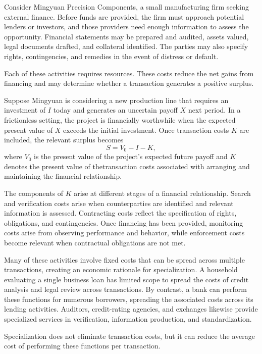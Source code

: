 Consider Mingyuan Precision Components, a small manufacturing firm seeking external finance. Before funds are provided, the firm must approach potential lenders or investors, and those providers need enough information to assess the opportunity. Financial statements may be prepared and audited, assets valued, legal documents drafted, and collateral identified. The parties may also specify rights, contingencies, and remedies in the event of distress or default.

Each of these activities requires resources. These costs reduce the net gains from financing and may determine whether a transaction generates a positive surplus.

Suppose Mingyuan is considering a new production line that requires an investment of $I$ today and generates an uncertain payoff $X$ next period. In a frictionless setting, the project is financially worthwhile when the expected present value of $X$ exceeds the initial investment. Once transaction costs $K$ are included, the relevant surplus becomes
\begin{equation}
S = V_{0}-I-K,
\label{eq:ch3-transaction-surplus}
\end{equation}
where $V_{0}$ is the present value of the project's expected future payoff and $K$ denotes the present value of thetransaction costs associated with arranging and maintaining the financial relationship.

The components of \(K\) arise at different stages of a financial relationship. Search and verification costs arise when counterparties are identified and relevant information is assessed. Contracting costs reflect the specification of rights, obligations, and contingencies. Once financing has been provided, monitoring costs arise from observing performance and behavior, while enforcement costs become relevant when contractual obligations are not met.

Many of these activities involve fixed costs that can be spread across multiple transactions, creating an economic rationale for specialization. A household evaluating a single business loan has limited scope to spread the costs of credit analysis and legal review across transactions. By contrast, a bank can perform these functions for numerous borrowers, spreading the associated costs across its lending activities. Auditors, credit-rating agencies, and exchanges likewise provide specialized services in verification, information production, and standardization.

Specialization does not eliminate transaction costs, but it can reduce the average cost of performing these functions per transaction.

